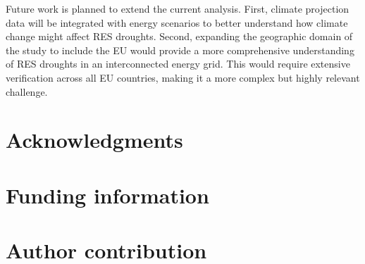 \documentclass[a4paper, 11p1t]{article}
\begin{document}
Future work is planned to extend the current analysis. First, climate projection data will be integrated with energy scenarios to better understand how climate change might affect RES droughts. Second, expanding the geographic domain of the study to include the EU would provide a more comprehensive understanding of RES droughts in an interconnected energy grid. This would require extensive verification across all EU countries, making it a more complex but highly relevant challenge.

\newpage
\section{Acknowledgments}

\section{Funding information}

\section{Author contribution}


\end{document}
